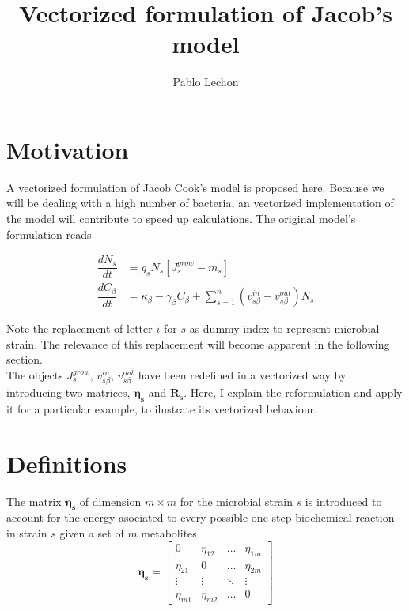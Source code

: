 \documentclass{article}
\title{Vectorized formulation of Jacob's model}
\author{Pablo Lechon}
\begin{document}
	\maketitle
	\section{Motivation}
		A vectorized formulation of Jacob Cook's model is proposed here. Because we will be dealing with a high number of bacteria, an vectorized implementation of the model will contribute to speed up calculations. The original model's formulation reads 
		
		\begin{align}
			\dfrac{dN_s}{dt} &= g_sN_s\left[J_s^{grow}-m_s\right] \label{eq:dNdt}\\
			\dfrac{dC_{\beta}}{dt} &= \kappa_{\beta} - \gamma_{\beta}C_{\beta} + \sum_{s = 1}^{n} \left(v_{s\beta}^{in} -v_{s\beta}^{out} \right)N_s \label{eq:dCdt}
		\end{align}
		
		Note the replacement of letter $ i $ for $ s $ as dummy index to represent microbial strain. The relevance of this replacement will become apparent in the following section. \\
		The objects $  J_s^{grow} $, $ v_{s\beta}^{in}  $,  $ v_{s\beta}^{out}  $ have been redefined in a vectorized way by introducing two matrices, $ \boldsymbol{\eta_s} $ and $ \boldsymbol{R_s} $. Here, I explain the reformulation and apply it for a particular example, to ilustrate its vectorized behaviour.\\
	\section{Definitions}
		The matrix $ \boldsymbol{\eta_s} $ of dimension $ m \times m $ for the microbial strain $ s $ is introduced to account for the energy asociated to every possible one-step biochemical reaction in strain $ s $ given a set of $ m $ metabolites 
		\[
			\boldsymbol{\eta_s}= \begin{bmatrix} 
				0 & \eta_{12} & \dots &  \eta_{1m} \\
				\eta_{21} & 0 & \dots & \eta_{2m} \\
				\vdots &  \vdots & \ddots & \vdots \\
				\eta_{m1} & \eta_{m2} & \dots & 0
			\end{bmatrix}
		\]
		
\end{document}
